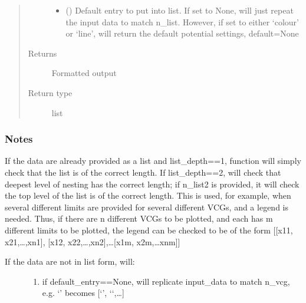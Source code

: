 \documentclass[letterpaper,10pt,english]{sphinxmanual}
\begin{document}
\begin{fulllineitems}
\begin{quote}
\begin{description}
\begin{itemize}
\item {} 
\sphinxAtStartPar
{} (\sphinxstyleliteralemphasis{\sphinxupquote{, }}\sphinxstyleliteralemphasis{\sphinxupquote{, }}\sphinxstyleliteralemphasis{\sphinxupquote{, }}\sphinxstyleliteralemphasis{\sphinxupquote{, }}) \textendash{} Default entry to put into list. If set to None, will just repeat the input data to match n\_list. However,
if set to either ‘colour’ or ‘line’, will return the default potential settings, default=None

\end{itemize}

\item[{Returns}] \leavevmode
\sphinxAtStartPar
{} \textendash{} Formatted output

\item[{Return type}] \leavevmode
\sphinxAtStartPar
list

\end{description}\end{quote}
\subsubsection*{Notes}

\sphinxAtStartPar
If the data are already provided as a list and list\_depth==1, function will simply check that the list is of the
correct length. If list\_depth==2, will check that deepest level of nesting has the correct length; if n\_list2 is
provided, it will check the top level of the list is of the correct length. This is used, for example,
when several different limits are provided for several different VCGs, and a legend is needed. Thus, if there are n
different VCGs to be plotted, and each has m different limits to be plotted, the legend can be checked to be of
the form {[}{[}x11, x21,…,xn1{]}, {[}x12, x22,…,xn2{]},…{[}x1m, x2m,…xnm{]}{]}
\begin{description}
\item[{If the data are not in list form, will:}] \leavevmode\begin{enumerate}
%
\item {} 
\sphinxAtStartPar
if default\_entry==None, will replicate input\_data to match n\_vcg, e.g. ‘\sphinxhyphen{}’ becomes {[}‘\sphinxhyphen{}’, ‘\sphinxhyphen{}‘,…{]}


\end{enumerate}
\end{description}
\end{fulllineitems}
\end{document}
